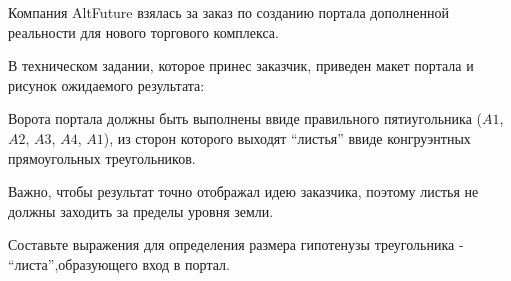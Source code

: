 
Компания AltFuture взялась за заказ по созданию портала дополненной реальности для нового торгового комплекса. 

В техническом задании, которое принес заказчик,  приведен макет портала и рисунок ожидаемого результата:

\begin{figure}[h]
    \begin{minipage}[h]{0.49\linewidth}
    \end{minipage}
    \hfill
    \begin{minipage}[h]{0.49\linewidth}
    \end{minipage}
\end{figure}

Ворота портала должны быть выполнены ввиде правильного пятиугольника ($A1$, $A2$, $A3$, $A4$, $A1$), из сторон которого выходят “листья” ввиде конгруэнтных  прямоугольных треугольников.

Важно, чтобы результат  точно отображал идею заказчика, поэтому листья не должны заходить за пределы уровня земли. 

Составьте выражения для определения размера гипотенузы треугольника - “листа”,образующего вход в портал.